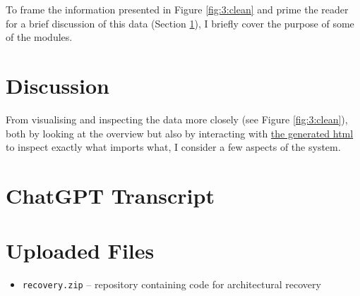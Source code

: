 \documentclass{article}
\begin{document}
To frame the information presented in Figure \ref{fig:3:clean} and prime the reader 
for a brief discussion of this data (Section \ref{discussion}),
I briefly cover the purpose of some of the modules.




\section{Discussion}
\label{discussion}

From visualising and inspecting the data more closely (see Figure \ref{fig:3:clean}), 
both by looking at the overview but also by interacting with 
\href{https://github.com/bjarkebrodin/recovery/blob/master/top_lvl_imports.html}{the generated html}
to inspect exactly what imports what,
I consider a few aspects of the system.



\clearpage



\clearpage
\appendix
\section{ChatGPT Transcript}
\label{apx:a}
\begin{figure}[h]

\end{figure}


\clearpage
\section{Uploaded Files}
\label{apx:b}
\begin{itemize}
  \item \verb|recovery.zip| -- repository containing code for architectural recovery
\end{itemize}
\end{document}

